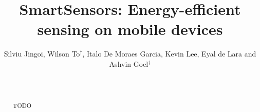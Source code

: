 \documentclass{sig-alternate-10pt}
\begin{document}
\date{}


\title{SmartSensors: Energy-efficient sensing on mobile devices}
\author{Silviu Jingoi, Wilson To$^\dagger$, Italo De Moraes Garcia, Kevin Lee, Eyal de Lara and Ashvin Goel$^\dagger$ \\
  \\  \\ }
\maketitle


\begin{abstract}
TODO
\end{abstract}







% 








%
\end{document}
